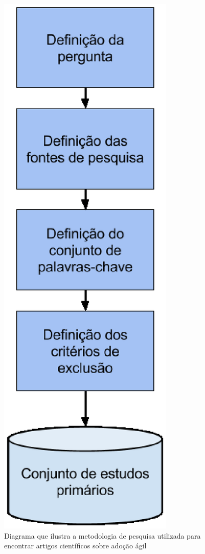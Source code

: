 \begin{figure}[H]
	\centering
	\captionsetup{justification=centering,margin=2cm}
	\includegraphics[scale=0.35]{capitulos/literatura/metodologia.eps}
	\caption{Diagrama que ilustra a metodologia de pesquisa utilizada para encontrar artigos científicos sobre adoção ágil}
	\label{fig:metodologia}
\end{figure}

